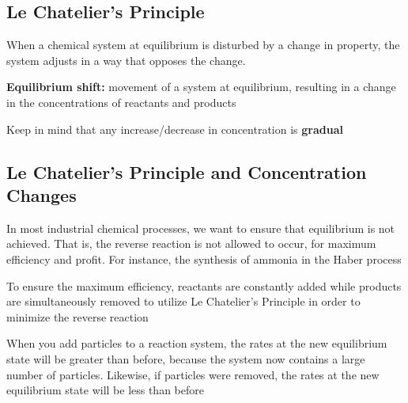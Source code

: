 \subsection{Le Chatelier's Principle}
When a chemical system at equilibrium is disturbed by a change in property, the system adjusts
in a way that opposes the change.
\begin{bulleted-list}
    \item \textbf{Equilibrium shift:} movement of a system at equilibrium, resulting in a change
        in the concentrations of reactants and products
    \item Keep in mind that any increase/decrease in concentration is \textbf{gradual}
\end{bulleted-list}

\subsection{Le Chatelier's Principle and Concentration Changes}
\begin{bulleted-list}
    \item In most industrial chemical processes, we want to ensure that equilibrium is not achieved.
        That is, the reverse reaction is not allowed to occur, for maximum efficiency and profit.
        For instance, the synthesis of ammonia in the Haber process
    \item To ensure the maximum efficiency, reactants are constantly added while products are
        simultaneously removed to utilize Le Chatelier's Principle in order to minimize the reverse
        reaction
    \item When you add particles to a reaction system, the rates at the new equilibrium state will
        be greater than before, because the system now contains a large number of particles. Likewise,
        if particles were removed, the rates at the new equilibrium state will be less than before
\end{bulleted-list}

